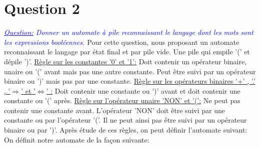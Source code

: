 \documentclass{article}
\begin{document}
\section*{Question 2}
\textit{
\textcolor{blue}{
\underline{Question:} 
Donner un automate à pile reconnaissant le langage dont les mots sont les expressions
booléennes.
}
}
\newline\newline
Pour cette question, nous proposant un automate reconnaissant le langage par état final et par pile vide. 
Une pile qui empile '(' et dépile ')'.
\newline\newline
\underline{Règle sur les constantes '0' et '1':}
Doit contenir un opérateur binaire, unaire ou '(' avant mais pas une autre constante. Peut être suivi par un opérateur binaire ou ')' mais pas par une constante. 
\newline\newline
\underline{Règle sur les opérateurs binaires '+' , '.' , '$\Rightarrow$' et '$\Leftrightarrow$' :}
Doit contenir une constante ou ')' avant et doit contenir une constante ou '(' après. 
\newline\newline
\underline{Règle sur l'opérateur unaire 'NON' et '(':}
Ne peut pas contenir une constante avant. L'opérateur 'NON' doit être suivi par une constante ou par l'opérateur '('. Il ne peut ainsi pas être suivi par un opérateur binaire ou par ')'. 
\newline\newline
Après étude de ces règles, on peut définir l'automate suivant:
\newline
\newline 
On définit notre automate de la façon suivante:
\newline
\newline
\end{document}
